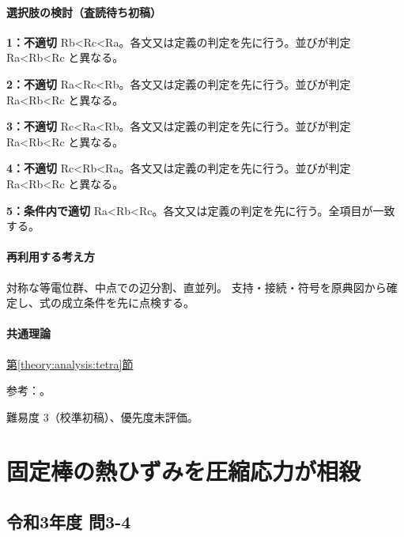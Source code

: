 \paragraph{選択肢の検討（査読待ち初稿）}\mbox{}\par

\noindent\textbf{1：不適切} Rb<Rc<Ra。各文又は定義の判定を先に行う。並びが判定 Ra<Rb<Rc と異なる。\par

\noindent\textbf{2：不適切} Ra<Rc<Rb。各文又は定義の判定を先に行う。並びが判定 Ra<Rb<Rc と異なる。\par

\noindent\textbf{3：不適切} Rc<Ra<Rb。各文又は定義の判定を先に行う。並びが判定 Ra<Rb<Rc と異なる。\par

\noindent\textbf{4：不適切} Rc<Rb<Ra。各文又は定義の判定を先に行う。並びが判定 Ra<Rb<Rc と異なる。\par

\noindent\textbf{5：条件内で適切} Ra<Rb<Rc。各文又は定義の判定を先に行う。全項目が一致する。\par

\paragraph{再利用する考え方} 対称な等電位群、中点での辺分割、直並列。 支持・接続・符号を原典図から確定し、式の成立条件を先に点検する。

\paragraph{共通理論} \hyperref[theory:analysis:tetra]{第\ref*{theory:analysis:tetra}節}

\par 参考：\cite{analysis57_resistors}。

\par 難易度 3（校準初稿）、優先度未評価。

\section{固定棒の熱ひずみを圧縮応力が相殺}

\subsection{令和3年度 問3-4}
\label{q:r03-reg-basic-3-4}

